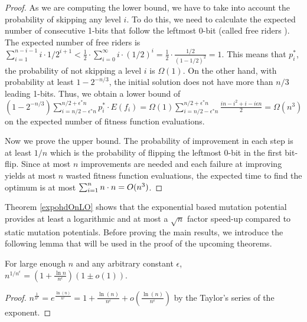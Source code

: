 \documentclass[lettersize,journal]{IEEEtran}
\begin{document}
\begin{proof}
As we are computing the lower bound, we have to take into account the probability of skipping any level $i$. To do this, we need to calculate the expected number of consecutive 1-bits that follow the leftmost 0-bit (called free riders \cite{DrosteJansenWegener2002}). The expected number of free riders is $\sum_{i=1}^{n-i-1} i \cdot 1/2^{i+1} < \frac{1}{2} \cdot \sum_{i=0}^{\infty} i \cdot (1/2)^i= \frac{1}{2} \cdot \frac{1/2}{(1-1/2)^2}=1$. This means that {\color{black}$p^{*}_{i}$}, the probability of not skipping a level $i$ is $\Omega(1)$.
On the other hand, with probability at least $1- 2^{-n/3}$, the initial solution does not have more than $n/3$ leading 1-bits. Thus, we obtain a lower 
bound of  $(1-2^{-n/3}) \sum_{i=n/2-\epsilon^*n}^{n/2+\epsilon^*n} p^{*}_{i}\cdot E(f_i)=\Omega(1) \sum_{i=n/2-\epsilon^*n}^{n/2+\epsilon^*n} \frac{in-i^2+i-i\epsilon n}{2}=\Omega(n^3)$ on the expected number of fitness function evaluations.

Now we prove the upper bound. The probability of improvement in each step is at least $1/n$ which is the probability of flipping the leftmost 0-bit {\color{black} in the first} bit-flip. Since at most $n$ improvements are needed and each failure at improving yields {\color{black} at most $n$} wasted fitness function evaluations, the expected time to find the optimum is at most $\sum_{i=1}^n n \cdot {\color{black}n}= O(n^3)$.

\end{proof}


Theorem \ref{expohdOnLO} shows that the exponential based mutation 
potential provides at least a logarithmic and at most a $\sqrt 
n$ factor speed-up compared to static mutation potentials. Before proving the main results, we introduce the following  lemma that will be used in the proof of the upcoming theorems.
\begin{lemma}\label{lem:expo}
For large enough $n$ and {\color{black}any arbitrary constant} $\epsilon$, 
$n^{1/n^{\epsilon}}= (1+\frac{\ln{n}}{n^{\epsilon}})(1 \pm o(1))$.
\end{lemma}
\begin{proof}
	$n^{\frac{1}{n^\epsilon}} = e^{\frac{\ln(n)}{n^\epsilon}} = 1 + \frac{\ln(n)}{n^\epsilon} + o(\frac{\ln(n)}{n^\epsilon})$ by the Taylor's series of the exponent.
	
\end{proof}
\end{document}
